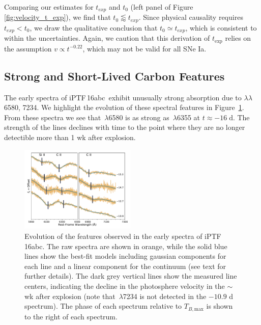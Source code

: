 \documentclass[twocolumn]{aastex61}
\newcommand{\abc}{iPTF\,16abc}
\newcommand{\ycao}[1]{{\color{red} ycao: {#1}}}
\begin{document}
Comparing our estimates for $t_{exp}$ and $t_0$ (left panel of 
Figure \ref{fig:velocity_t_exp}), we find that 
$t_0\lessapprox t_{exp}$.
Since physical causality requires $t_{exp}<t_0$, we draw the qualitative
conclusion that $t_0\simeq t_{exp}$, which is consistent to within the uncertainties. Again, we caution that this derivation of $t_\mathrm{exp}$ relies on the assumption $v \propto t^{-0.22}$, which may not be valid for all SNe Ia.  


\subsection{Strong and Short-Lived Carbon Features}
\label{sec:carbon}

The early spectra of \abc\ exhibit unusually strong absorption due 
to  $\lambda\lambda$6580, 7234. We highlight the evolution 
of these spectral features in Figure~\ref{fig:carbon}. From these 
spectra we see that \,$\lambda$6580 is as strong as 
\,$\lambda$6355 at $t \approx -16 \; \mathrm{d}$. The 
strength of the  lines declines with time to the point 
where they are no longer detectible more than 1 wk after explosion.

\begin{figure}[]
  \centering
  \includegraphics[width=0.49\textwidth]{CarbonFeature.pdf}
  \caption{Evolution of the  features observed in the 
  early spectra of \abc. The raw spectra are shown in orange, while 
  the solid blue lines show the best-fit models including gaussian 
  components for each line and a linear component for the continuum 
  (see text for further details). The dark grey vertical lines show 
  the measured line centers, indicating the decline in the 
  photosphere velocity in the $\sim$wk after explosion (note that 
  \,$\lambda$7234 is not detected in the $-10.9$ d 
  spectrum). The phase of each spectrum relative to 
  $T_{B,\mathrm{max}}$ is shown to the right of each spectrum.
  }
  \label{fig:carbon}
\end{figure}
\end{document}

